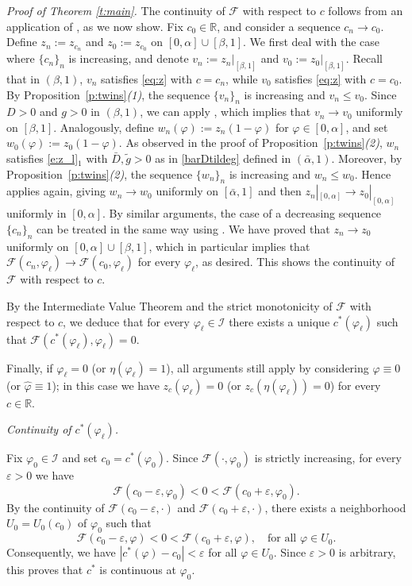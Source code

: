 \documentclass[11pt,a4paper]{article}
\renewcommand{\phi}{\varphi}
\newenvironment{proofof}[1]{\smallskip\noindent\emph{Proof of #1.}%
\hspace{1pt}}{\hspace{-5pt}{\nobreak\quad\nobreak\hfill\nobreak%
$\square$\vspace{8pt}\par}\smallskip\goodbreak}
\begin{document}
\begin{proofof}{Theorem \ref{t:main}}
The continuity of $\mathcal{F}$ with respect to $c$ follows from an application of  \cite[Lemma 3.3]{BCM1}, as we now show.  Fix $c_0 \in \mathbb{R}$, and consider a sequence $c_n \to c_0$. Define $z_n := z_{c_n}$ and $z_0 := z_{c_0}$ on $[0,\alpha] \cup [\beta,1]$. We first deal with the case where $\{c_n\}_n$ is increasing, and denote $v_n := z_n|_{[\beta,1]}$ and $v_0 := z_0|_{[\beta,1]}$. Recall that in $(\beta,1)$, $v_n$ satisfies \eqref{eq:z} with $c = c_n$, while $v_0$ satisfies \eqref{eq:z} with $c = c_0$. By Proposition~\ref{p:twins}\emph{(1)}, the sequence $\{v_n\}_n$ is increasing and $v_n \le v_0$.  Since $D>0$ and $g>0$ in $(\beta,1)$, we can apply \cite[Lemma 3.3]{BCM1}, which implies that $v_n \to v_0$ uniformly on $[\beta,1]$.  Analogously, define $w_n(\varphi) := z_n(1-\varphi)$ for $\varphi \in [0,\alpha]$, and set $w_0(\varphi) := z_0(1-\varphi)$. As observed in the proof of Proposition~\ref{p:twins}\emph{(2)}, $w_n$ satisfies \eqref{e:z_l}$_1$ with $\bar D, \tilde g >0$ as in \eqref{barDtildeg} defined in $(\bar\alpha,1)$. Moreover, by Proposition~\ref{p:twins}\emph{(2)}, the sequence $\{w_n\}_n$ is increasing and $w_n \le w_0$. Hence \cite[Lemma 3.3]{BCM1} applies again, giving $w_n \to w_0$ uniformly on $[\bar\alpha,1]$ and then  $z_n|_{[0, \alpha]} \to z_0|_{[0, \alpha]}$ uniformly in $[0, \alpha]$.  By similar arguments, the case of a decreasing sequence $\{c_n\}_n$ can be treated in the same way using \cite[Lemma 3.3]{BCM1}. We  have proved that $z_n \to z_0$ uniformly on $[0,\alpha] \cup [\beta,1]$, which in particular implies that $\mathcal F(c_n, \varphi_\ell) \to \mathcal F(c_0, \varphi_\ell)$ for every $\varphi_\ell$, as desired. This shows the continuity of $\mathcal{F}$ with respect to $c$.

By the Intermediate Value Theorem and the strict monotonicity of $\mathcal{F}$ with respect to $c$, we deduce that for every $\varphi_\ell \in \mathcal I$ there exists a unique $c^*(\varphi_\ell)$ such that $\mathcal F\left(c^*(\varphi_\ell),\varphi_\ell\right)=0$.

Finally, if $\varphi_\ell = 0$ (or $\eta(\varphi_\ell)=1$), all arguments still apply by considering $\hat{\varphi}\equiv 0$ (or $\hat{\varphi}\equiv 1$); in this case we have $z_c(\varphi_\ell)=0$ (or $z_c(\eta(\varphi_\ell))=0$) for every $c\in\mathbb{R}$.

\medskip
\emph{Continuity of $c^*(\phi_{\ell})$.}

\noindent Fix $\varphi_0 \in \mathcal I$ and set $c_0 = c^*(\varphi_0)$.  
Since $\mathcal F(\cdot,\varphi_0)$ is strictly increasing, for every $\varepsilon > 0$ we have
\[
\mathcal F(c_0 - \varepsilon, \varphi_0) < 0 < \mathcal F(c_0 + \varepsilon, \varphi_0).
\]
By the continuity of $\mathcal F(c_0 - \varepsilon, \cdot)$ and $\mathcal F(c_0 + \varepsilon, \cdot)$, there exists a neighborhood $U_0=U_0(c_0)$ of $\varphi_0$ such that
\[
\mathcal F(c_0 - \varepsilon, \varphi) < 0 < \mathcal F(c_0 + \varepsilon, \varphi),
\quad \text{for all } \varphi \in U_0.
\]
Consequently, we have $|c^*(\varphi) - c_0| < \varepsilon$ 
for all  $\varphi \in U_0$. Since $\varepsilon>0$ is arbitrary, this proves that $c^*$ is continuous at $\varphi_0$.


\end{proofof}
\end{document}
